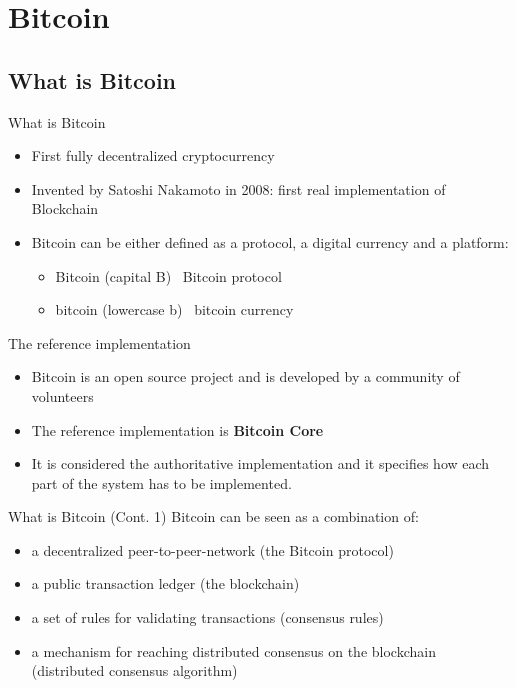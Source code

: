 \documentclass{beamer}
\begin{document}
  \section{Bitcoin}
  \subsection{What is Bitcoin}
  \begin{frame}{What is Bitcoin}
    \begin{itemize}
      \item First fully decentralized cryptocurrency \pause
      \item Invented by Satoshi Nakamoto in 2008: first real implementation of
      Blockchain \pause
      \item Bitcoin can be either defined as a protocol, a digital currency
      and a platform: \pause
      \begin{itemize}
        \item Bitcoin (capital B)  \MVRightarrow\, Bitcoin protocol
        \item bitcoin (lowercase b) \MVRightarrow\, bitcoin  currency
      \end{itemize} \pause
    \end{itemize}

    \begin{block}{The reference implementation}
      \begin{itemize}
        \item Bitcoin is an open source project and is developed by a community of volunteers
        \item The reference implementation is \textbf{Bitcoin Core}
        \item It is considered the authoritative implementation and it specifies
        how each part of the system has to be implemented.
      \end{itemize}
    \end{block}
  \end{frame}




  \begin{frame}{What is Bitcoin (Cont. 1)}
    Bitcoin can be seen as a combination of:
    \begin{itemize}
      \item a decentralized peer-to-peer-network (the Bitcoin protocol) \pause
      \item a public transaction ledger (the blockchain) \pause
      \item a set of rules for validating transactions (consensus rules) \pause
      \item a mechanism for reaching distributed consensus on the blockchain
      (distributed consensus algorithm) \pause
    \end{itemize}
  \end{frame}
\end{document}
